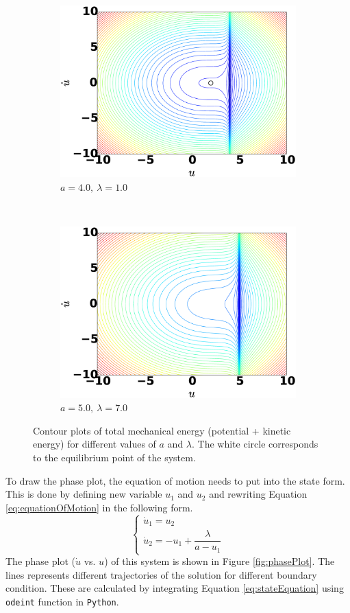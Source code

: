 \documentclass[14pt, a4paper]{extreport}
\begin{document}
\begin{figure}[H]
\begin{subfigure}[h]{8.0 cm}
        \includegraphics[width=8.0 cm]{figure/mechanical_a40_lambda40.eps}
		\caption{$a=4.0,\ \lambda = 1.0$}
    \end{subfigure}
    \\
    	\begin{subfigure}[h]{8.0 cm}
        \includegraphics[width=8.0 cm]{figure/mechanical_a50_lambda70.eps}
		\caption{$a=5.0,\ \lambda = 7.0$}
    \end{subfigure}
    \caption{Contour plots of total mechanical energy (potential + kinetic energy) for different values of $a$ and $\lambda$. The white circle corresponds to the equilibrium point of the system.}
    \label{fig:potentialFunction}
\end{figure}
%
To draw the phase plot, the equation of motion needs to put into the state form. This is done by defining new variable $u_1$ and $u_2$ and rewriting Equation \eqref{eq:equationOfMotion} in the following form.
%
\begin{equation}\label{eq:stateEquation}
	\begin{cases}
    \dot{u}_1 = u_2 \\
    \dot{u}_2 = -u_1 + \dfrac{\lambda}{a - u_1}
	\end{cases}
\end{equation}
%
The phase plot ($\dot{u}$ vs. $u$) of this system is shown in Figure \ref{fig:phasePlot}. The lines represents different trajectories of the solution for different boundary condition. These are calculated by integrating Equation \eqref{eq:stateEquation} using \texttt{odeint} function in \texttt{Python}.
\end{document}

